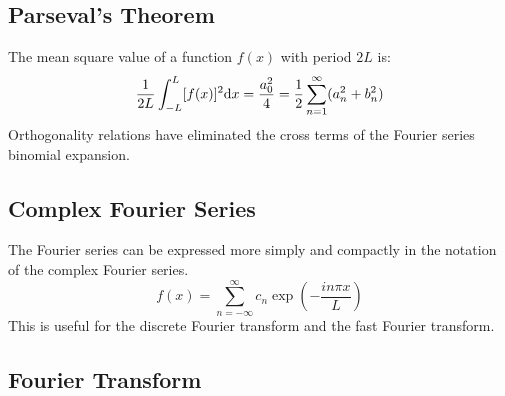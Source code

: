 \subsection*{Parseval's Theorem}
The mean square value of a function $f(x)$ with period $2L$ is:
\begin{equation*}
    \frac{1}{2L}\int_{-L}^{L}[f(x)]^2 \differential x = \frac{a_0^2}{4} = \frac{1}{2}\sum_{n=1}^{\infty}(a_n^2 + b_n^2)
\end{equation*}
Orthogonality relations have eliminated the cross terms of the Fourier series binomial expansion.
\subsection*{Complex Fourier Series}
The Fourier series can be expressed more simply and compactly in the notation of the complex Fourier series.
\begin{equation*}
    f(x) = \sum_{n = -\infty}^{\infty}c_n \exp\left(-\frac{in\pi x}{L}\right)
\end{equation*}
This is useful for the discrete Fourier transform and the fast Fourier transform.
\subsection*{Fourier Transform}
